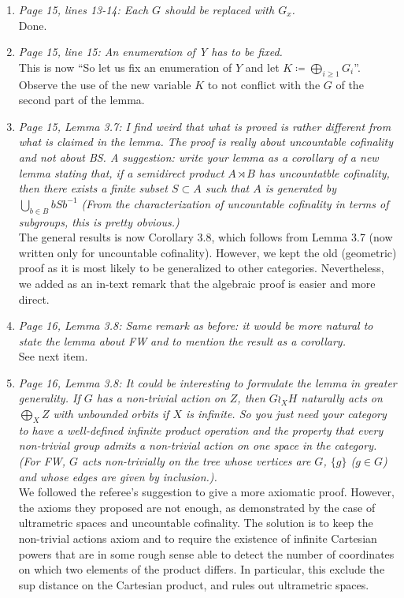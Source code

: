 \documentclass[english,a4paper]{article}
\begin{document}
\begin{enumerate}
%
\item\textit{Page 15, lines 13-14: Each $G$ should be replaced with $G_x$.}\\
Done.
%
\item\textit{Page 15, line 15: An enumeration of Y has to be fixed.}\\
This is now ``So let us fix an enumeration of $Y$ and let $K\coloneqq \bigoplus_{i\geq 1}G_i$''. Observe the use of the new variable $K$ to not conflict with the $G$ of the second part of the lemma.
%
\item\textit{Page 15, Lemma 3.7: I find weird that what is proved is rather different from what is claimed in the lemma. The proof is really about uncountable cofinality and not about BS.
A suggestion: write your lemma as a corollary of a new lemma stating that, if a semidirect product $A\rtimes B$ has uncountatble cofinality, then there exists a finite subset $S\subset A$ such that $A$ is generated by $\bigcup_{b\in B}bSb^{-1}$ (From the characterization of uncountable cofinality in terms of subgroups, this is pretty obvious.)}\\
The general results is now Corollary 3.8, which follows from Lemma 3.7 (now written only for uncountable cofinality). However, we kept the old (geometric) proof as it is most likely to be generalized to other categories. Nevertheless, we added as an in-text remark that the algebraic proof is easier and more direct.
%
\item\textit{Page 16, Lemma 3.8: Same remark as before: it would be more natural to state the lemma about FW and to mention the result as a corollary.}\\
See next item.
%
\item\textit{Page 16, Lemma 3.8: It could be interesting to formulate the lemma in greater generality. If $G$ has a non-trivial action on $Z$, then $G\wr_XH$ naturally acts on $\bigoplus_X Z$ with unbounded orbits if $X$ is infinite. So you just need your category to have a well-defined infinite product operation and the property that every non-trivial group admits a non-trivial action on one space in the category. (For FW, $G$ acts non-trivially on the tree whose vertices are $G$, $\{g\}$ ($g\in G$) and whose edges are given by inclusion.).}\\
We followed the referee's suggestion to give a more axiomatic proof. However, the axioms they proposed are not enough, as demonstrated by the case of ultrametric spaces and uncountable cofinality. The solution is to keep the non-trivial actions axiom and to require the existence of infinite Cartesian powers that are in some rough sense able to detect the number of coordinates on which two elements of the product differs. In particular, this exclude the sup distance on the Cartesian product, and rules out ultrametric spaces.

\end{enumerate}
\end{document}
